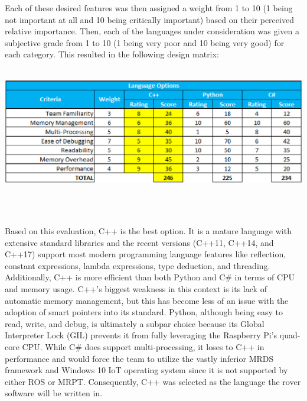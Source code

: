 \documentclass[onecolumn, draftclsnofoot,10pt, compsoc]{IEEEtran}
\begin{document}
\par Each of these desired features was then assigned a weight from 1 to 10 (1 being not important at all and 10 being critically important) based on their perceived relative importance. Then, each of the languages under consideration was given a subjective grade from 1 to 10 (1 being very poor and 10 being very good) for each category. This resulted in the following design matrix:\\ \\
\begin{minipage}{\linewidth}
\begin{center}
\includegraphics[width=\textwidth]{design_matrix.eps}
\end{center}
\end{minipage}\\ \\
\par Based on this evaluation, C++ is the best option. It is a mature language with extensive standard libraries and the recent versions (C++11, C++14, and C++17) support most modern programming
language features like reflection, constant expressions, lambda expressions, type deduction, and threading. Additionally, C++ is more efficient than both Python and C\# in terms of CPU and memory usage. C++'s biggest weakness in this context is its lack of automatic memory management, but this has become less of an issue with the adoption of smart pointers into its standard. Python, although being easy to read, write, and debug, is ultimately a subpar choice because its Global Interpreter Lock (GIL) prevents it from fully leveraging the Raspberry Pi's quad-core CPU. While C\# does support multi-processing,
it loses to C++ in performance and would force the team to utilize the vastly inferior MRDS framework and Windows 10 IoT operating system since it is not supported by either ROS or MRPT. Consequently, C++ was selected as the language the rover software will be written in.
\end{document}
